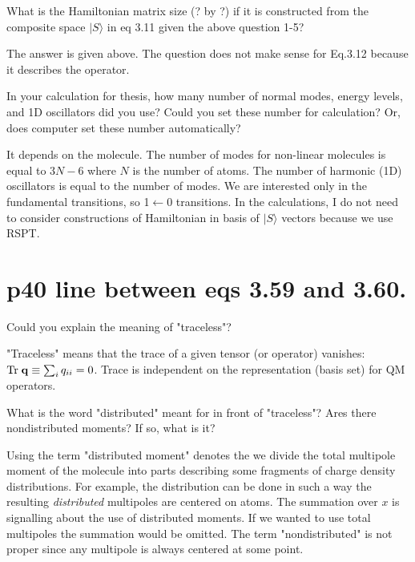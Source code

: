 \documentclass{exam}
\begin{document}
\begin{questions}
%
\question What is the Hamiltonian matrix size (? by ?) if it is constructed 
from the composite space $\vert S \rangle$ in eq 3.11 given the above question 1-5?

\begin{solution}
The answer is given above. The question does not make sense for Eq.3.12 because it describes the operator.
\end{solution}

%
\question In your calculation for thesis, how many number of normal modes, energy levels, 
and 1D oscillators did you use? Could you set these number for calculation? Or, does computer set these number automatically?

\begin{solution}
It depends on the molecule. The number of modes for non-linear molecules is equal to 
$3N-6$ where $N$ is the number of atoms.
The number of harmonic (1D) oscillators is equal to the number of modes. 
We are interested only in the fundamental transitions, so 1$\leftarrow$0 transitions. 
In the calculations, I do not need to consider constructions of Hamiltonian in basis of $\vert S \rangle$ vectors
because we use RSPT.
\end{solution}


\end{questions}

\section{p40 line between eqs 3.59 and 3.60.}

\begin{questions}
\question Could you explain the meaning of "traceless"?

\begin{solution}
"Traceless" means that the trace of a given tensor (or operator) vanishes: ${\rm Tr}\; {\bf q} \equiv \sum_i q_{ii} = 0$.
Trace is independent on the representation (basis set) for QM operators.
\end{solution}

\question What is the word "distributed" meant for in front of "traceless"? 
Ares there nondistributed moments? If so, what is it? 

\begin{solution}
Using the term "distributed moment" denotes the we divide the total multipole moment of the molecule
into parts describing some fragments of charge density distributions. For example, the distribution
can be done in such a way the resulting \emph{distributed} multipoles
are centered on atoms. The summation over $x$ is signalling about the use of distributed moments.
If we wanted to use total multipoles the summation would be omitted. The term "nondistributed" 
is not proper since any multipole is always
centered at some point.
\end{solution}


\end{questions}
\end{document}
